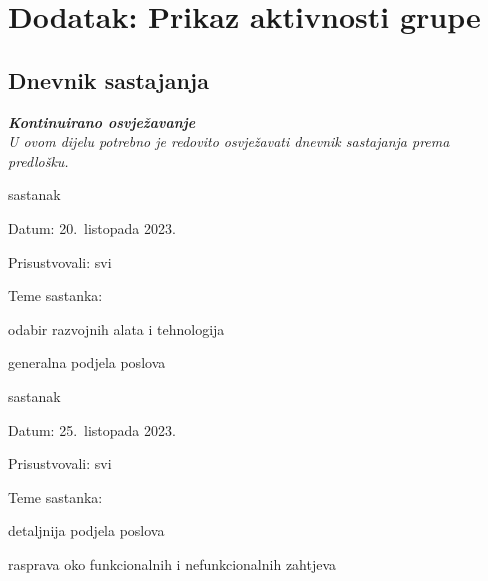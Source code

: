 \chapter*{Dodatak: Prikaz aktivnosti grupe}
		
		\section*{Dnevnik sastajanja}
		
		\textbf{\textit{Kontinuirano osvježavanje}}\\
		
		 \textit{U ovom dijelu potrebno je redovito osvježavati dnevnik sastajanja prema predlošku.}
		
		\begin{packed_enum}
			\item  sastanak
			
			\item[] \begin{packed_item}
				\item Datum: 20.\ listopada 2023.
				\item Prisustvovali: svi
				\item Teme sastanka:
				\begin{packed_item}
					\item  odabir razvojnih alata i tehnologija
					\item  generalna podjela poslova
				\end{packed_item}
			\end{packed_item}
			
			\item  sastanak
			\item[] \begin{packed_item}
				\item Datum: 25.\ listopada 2023.
				\item Prisustvovali: svi
				\item Teme sastanka:
				\begin{packed_item}
					\item  detaljnija podjela poslova
					\item  rasprava oko funkcionalnih i nefunkcionalnih zahtjeva
				\end{packed_item}
			\end{packed_item}
			

\end{packed_enum}
